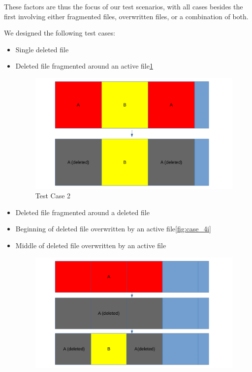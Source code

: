 These factors are thus the focus of our test scenarios, with all cases besides the first involving either fragmented files, overwritten files, or a combination of both.

We designed the following test cases:
\begin{itemize}
    \item [1] Single deleted file
    \item [2] Deleted file fragmented around an active file\ref{fig:case_2}
    \begin{figure}[h]
        \centering
        \includegraphics[width=\linewidth]{fig/case2.png}
        \caption{Test Case 2}
        \label{fig:case_2}
    \end{figure}
    \item [3]
 Deleted file fragmented around a deleted file
    \item [4i]
 Beginning of deleted file overwritten by an active file\ref{fig:case_4i}
    \item [4ii]
 Middle of deleted file overwritten by an active file
        \begin{figure}[h]
        \centering
        \includegraphics[width=\linewidth]{fig/case4ii.png}

\end{figure}
\end{itemize}
